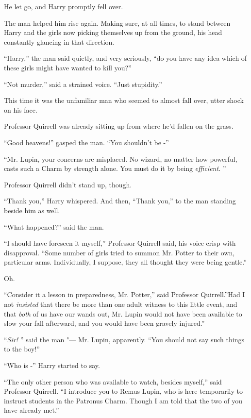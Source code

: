 He let go, and Harry promptly fell over.

The man helped him rise again. Making sure, at all times, to stand
between Harry and the girls now picking themselves up from the ground,
his head constantly glancing in that direction.

``Harry,'' the man said quietly, and very seriously, ``do you have any
idea which of these girls might have wanted to kill you?''

``Not murder,'' said a strained voice. ``Just stupidity.''

This time it was the unfamiliar man who seemed to almost fall over,
utter shock on his face.

Professor Quirrell was already sitting up from where he'd fallen on the
grass.

``Good heavens!'' gasped the man. ``You shouldn't be -''

``Mr. Lupin, your concerns are misplaced. No wizard, no matter how
powerful, casts such a Charm by strength alone. You must do it by being
\emph{efficient.} ''

Professor Quirrell didn't stand up, though.

``Thank you,'' Harry whispered. And then, ``Thank you,'' to the man
standing beside him as well.

``What happened?'' said the man.

``I should have foreseen it myself,'' Professor Quirrell said, his voice
crisp with disapproval. ``Some number of girls tried to summon Mr.
Potter to their own, particular arms. Individually, I suppose, they all
thought they were being gentle.''

Oh.

``Consider it a lesson in preparedness, Mr. Potter,'' said Professor
Quirrell.''Had I not \emph{insisted} that there be more than one adult
witness to this little event, and that \emph{both} of us have our wands
out, Mr. Lupin would not have been available to slow your fall
afterward, and you would have been gravely injured.''

``\emph{Sir!} '' said the man "--- Mr. Lupin, apparently. ``You should not
say such things to the boy!''

``Who is -'' Harry started to say.

``The only other person who was available to watch, besides myself,''
said Professor Quirrell. ``I introduce you to Remus Lupin, who is here
temporarily to instruct students in the Patronus Charm. Though I am told
that the two of you have already met.''

